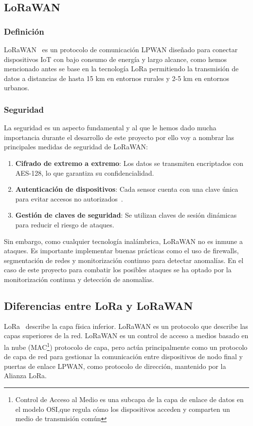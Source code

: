 \subsection{LoRaWAN}

\subsubsection{Definición}

LoRaWAN~\cite{Mono:Lorawan} es un protocolo de comunicación LPWAN diseñado para conectar dispositivos IoT con bajo consumo de energía y largo alcance, como hemos mencionado antes se base en la tecnología LoRa permitiendo la transmisión de datos a distancias de hasta 15 km en entornos rurales y 2-5 km en entornos urbanos.

\subsubsection{Seguridad}

La seguridad es un aspecto fundamental y al que le hemos dado mucha importancia durante el desarrollo de este proyecto por ello voy a nombrar las principales medidas de seguridad de LoRaWAN:

\begin{enumerate}
   \item \textbf{Cifrado de extremo a extremo}: Los datos se transmiten encriptados con AES-128, lo que garantiza su confidencialidad.
    \item \textbf{Autenticación de dispositivos}: Cada sensor cuenta con una clave única para evitar accesos no autorizados~\cite{TTN:Sec}.
    \item \textbf{Gestión de claves de seguridad}: Se utilizan claves de sesión dinámicas para reducir el riesgo de ataques.
\end{enumerate}

Sin embargo, como cualquier tecnología inalámbrica, LoRaWAN no es inmune a ataques. Es importante implementar buenas prácticas como el uso de firewalls, segmentación de redes y monitorización continuo para detectar anomalías. En el caso de este proyecto para combatir los posibles ataques se ha optado por la monitorización continua y detección de anomalías. 

\subsection{Diferencias entre LoRa y LoRaWAN}

LoRa~\cite{Moko:Lora} describe la capa física inferior. LoRaWAN es un protocolo que describe las capas superiores de la red. LoRaWAN es un control de acceso a medios basado en la nube (MAC\footnote{Control de Acceso al Medio es una subcapa de la capa de enlace de datos en el modelo OSI,que regula cómo los dispositivos acceden y comparten un medio de transmisión común}) protocolo de capa, pero actúa principalmente como un protocolo de capa de red para gestionar la comunicación entre dispositivos de nodo final y puertas de enlace LPWAN, como protocolo de dirección, mantenido por la Alianza LoRa.

